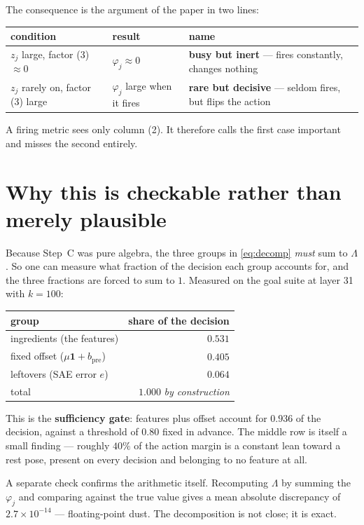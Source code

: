 \documentclass[11pt]{article}
\newcommand{\bpre}{b_{\mathrm{pre}}}
\begin{document}
\medskip
\noindent
The consequence is the argument of the paper in two lines:
\begin{center}
\begin{tabular}{@{}lll@{}}
\toprule
condition & result & name \\
\midrule
$z_j$ large, factor (3) $\approx 0$ & $\varphi_j \approx 0$ &
  \textbf{busy but inert} --- fires constantly, changes nothing \\
$z_j$ rarely on, factor (3) large & $\varphi_j$ large when it fires &
  \textbf{rare but decisive} --- seldom fires, but flips the action \\
\bottomrule
\end{tabular}
\end{center}
\noindent
A firing metric sees only column (2). It therefore calls the first case important and misses
the second entirely.

\section{Why this is checkable rather than merely plausible}
\label{sec:check}

Because Step~C was pure algebra, the three groups in \eqref{eq:decomp} \emph{must} sum to
$\Lambda$. So one can measure what fraction of the decision each group accounts for, and the
three fractions are forced to sum to $1$. Measured on the goal suite at layer 31 with $k=100$:

\begin{center}
\begin{tabular}{@{}lr@{}}
\toprule
group & share of the decision \\
\midrule
ingredients (the features)          & $0.531$ \\
fixed offset ($\mu\mathbf{1} + \bpre$) & $0.405$ \\
leftovers (SAE error $e$)           & $0.064$ \\
\midrule
total                               & $1.000$ \quad \emph{by construction} \\
\bottomrule
\end{tabular}
\end{center}

\noindent
This is the \textbf{sufficiency gate}: features plus offset account for $0.936$ of the
decision, against a threshold of $0.80$ fixed in advance. The middle row is itself a small
finding --- roughly $40\%$ of the action margin is a constant lean toward a rest pose, present
on every decision and belonging to no feature at all.

A separate check confirms the arithmetic itself. Recomputing $\Lambda$ by summing the
$\varphi_j$ and comparing against the true value gives a mean absolute discrepancy of
$2.7 \times 10^{-14}$ --- floating-point dust. The decomposition is not close; it is exact.
\end{document}
